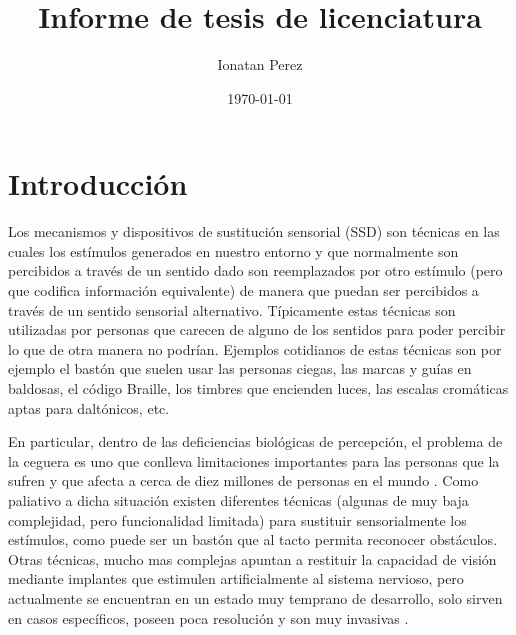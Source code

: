 \documentclass{article}
\title{Informe de tesis de licenciatura}
\author{Ionatan Perez}
\date{\today}
\numberwithin{figure}{section}
\begin{document}



\renewcommand{\lstlistingname}{Código}




\maketitle

\clearpage 

\tableofcontents  %
\clearpage

\section{Introducción}

    Los mecanismos y dispositivos de sustitución sensorial (SSD) son técnicas en las cuales los estímulos generados en nuestro entorno y que normalmente son percibidos a través de un sentido dado son reemplazados por otro estímulo (pero que codifica información equivalente) de manera que puedan ser percibidos a través de un sentido sensorial alternativo. Típicamente estas técnicas son utilizadas por personas que carecen de alguno de los sentidos para poder percibir lo que de otra manera no podrían. Ejemplos cotidianos de estas técnicas son por ejemplo el bastón que suelen usar las personas ciegas, las marcas y guías en baldosas, el código Braille, los timbres que encienden luces, las escalas cromáticas aptas para daltónicos, etc. 
    
    En particular, dentro de las deficiencias biológicas de percepción, el problema de la ceguera es uno que conlleva limitaciones importantes para las personas que la sufren y que afecta a cerca de diez millones de personas en el mundo \cite{NroCiegos}. Como paliativo a dicha situación existen diferentes técnicas (algunas de muy baja complejidad, pero funcionalidad limitada) para sustituir sensorialmente los estímulos, como puede ser un bastón que al tacto permita reconocer obstáculos. Otras técnicas, mucho mas complejas apuntan a restituir la capacidad de visión mediante implantes que estimulen artificialmente al sistema nervioso\cite{Implantes1,Implantes2}, pero actualmente se encuentran en un estado muy temprano de desarrollo, solo sirven en casos específicos, poseen poca resolución y son muy invasivas \cite{Implantes3,Implantes4}. 
    
\end{document}
